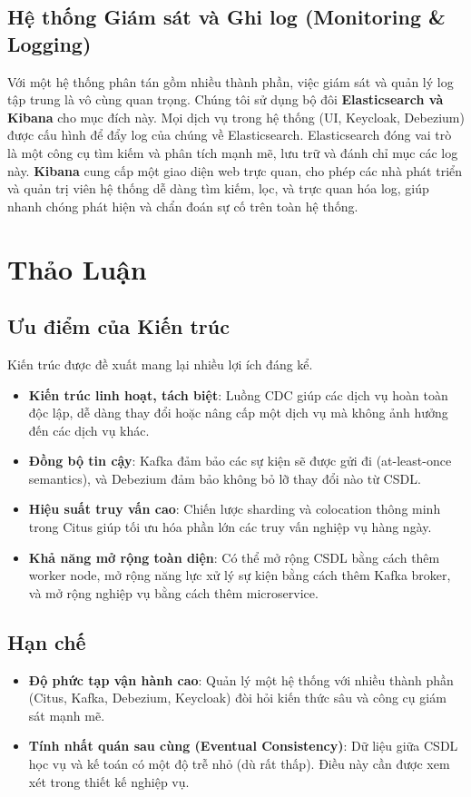 \documentclass[conference]{IEEEtran}
\begin{document}
\subsection{Hệ thống Giám sát và Ghi log (Monitoring \& Logging)}
Với một hệ thống phân tán gồm nhiều thành phần, việc giám sát và quản lý log tập trung là vô cùng quan trọng. Chúng tôi sử dụng bộ đôi \textbf{Elasticsearch và Kibana} cho mục đích này. Mọi dịch vụ trong hệ thống (UI, Keycloak, Debezium) được cấu hình để đẩy log của chúng về Elasticsearch. Elasticsearch đóng vai trò là một công cụ tìm kiếm và phân tích mạnh mẽ, lưu trữ và đánh chỉ mục các log này. \textbf{Kibana} cung cấp một giao diện web trực quan, cho phép các nhà phát triển và quản trị viên hệ thống dễ dàng tìm kiếm, lọc, và trực quan hóa log, giúp nhanh chóng phát hiện và chẩn đoán sự cố trên toàn hệ thống.

\section{Thảo Luận}
\subsection{Ưu điểm của Kiến trúc}
Kiến trúc được đề xuất mang lại nhiều lợi ích đáng kể.
\begin{itemize}
    \item \textbf{Kiến trúc linh hoạt, tách biệt}: Luồng CDC giúp các dịch vụ hoàn toàn độc lập, dễ dàng thay đổi hoặc nâng cấp một dịch vụ mà không ảnh hưởng đến các dịch vụ khác.
    \item \textbf{Đồng bộ tin cậy}: Kafka đảm bảo các sự kiện sẽ được gửi đi (at-least-once semantics), và Debezium đảm bảo không bỏ lỡ thay đổi nào từ CSDL.
    \item \textbf{Hiệu suất truy vấn cao}: Chiến lược sharding và colocation thông minh trong Citus giúp tối ưu hóa phần lớn các truy vấn nghiệp vụ hàng ngày.
    \item \textbf{Khả năng mở rộng toàn diện}: Có thể mở rộng CSDL bằng cách thêm worker node, mở rộng năng lực xử lý sự kiện bằng cách thêm Kafka broker, và mở rộng nghiệp vụ bằng cách thêm microservice.
\end{itemize}

\subsection{Hạn chế}
\begin{itemize}
    \item \textbf{Độ phức tạp vận hành cao}: Quản lý một hệ thống với nhiều thành phần (Citus, Kafka, Debezium, Keycloak) đòi hỏi kiến thức sâu và công cụ giám sát mạnh mẽ.
    \item \textbf{Tính nhất quán sau cùng (Eventual Consistency)}: Dữ liệu giữa CSDL học vụ và kế toán có một độ trễ nhỏ (dù rất thấp). Điều này cần được xem xét trong thiết kế nghiệp vụ.
\end{itemize}
\end{document}
